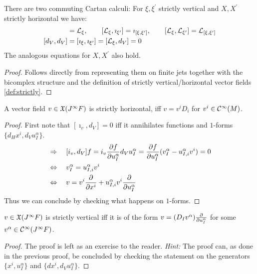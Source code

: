 \begin{prop}
  There are two commuting Cartan calculi: For $\xi, \xi^\prime$ strictly vertical and $X,X^\prime$ strictly horizontal we have:
  \begin{align*}
    [\imath_\xi, d_V] &= \lie{\xi}, \quad \quad [\lie{\xi}, \imath_{\xi^\prime}] = \imath_{[\xi, \xi^\prime]}, \quad \quad [\lie{\xi}, \lie{\xi^\prime}] = \lie{[\xi, \xi^\prime]}\\
    [d_V,d_V] &= [\imath_\xi, \imath_{\xi^\prime}] = [\lie{\xi}, d_V] = 0
  \end{align*}
  The analogous equations for $X, X^\prime$ also hold.
\begin{proof}
  Follows directly from representing them on finite jets together with the bicomplex structure and the definition of strictly vertical/horizontal vector fields \ref{def:strictly}.
\end{proof}
\end{prop}

\begin{lem}
  A vector field $v\in \mathfrak{X}(J^\infty F)$ is strictly horizontal, iff $v = v^i D_i$ for $v^i \in \mathcal{C}^{\infty}(M)$.
\begin{proof}
  First note that $[\imath_v, d_V] = 0$ iff it annihilates functions and $1$-forms $\{d_H x^i, d_V u^\alpha_I \}$.
  \begin{align*}
    &\Rightarrow \quad [i_v, d_V] f = i_v \frac{\partial f}{\partial u^\alpha_I} d_V u^\alpha_I = \frac{\partial f}{\partial u^\alpha_I} (v^\alpha_I - u^\alpha_{I,i} v^i) = 0\\
    &\Leftrightarrow \quad v^\alpha_I = u^\alpha_{I,i} v^i\\
    &\Leftrightarrow \quad v = v^i \frac{\partial }{\partial x^i} + u^\alpha_{I,i} v^i \frac{\partial }{\partial u^\alpha_I}
  \end{align*}
  Thus we can conclude by checking what happens on $1$-forms.
\end{proof}
\end{lem}

\begin{lem}
  $v\in \mathfrak{X}(J^\infty F)$ is strictly vertical iff it is of the form $v = (D_I v^\alpha) \frac{\partial }{\partial u^\alpha_I}$ for some $v^\alpha \in \mathcal{C}^{\infty}(J^\infty F)$.
\begin{proof}
  The proof is left as an exercise to the reader. \emph{Hint:} The proof can, as done in the previous proof, be concluded by checking the statement on the generators $\{x^i, u^\alpha_I\}$ and $\{dx^i, d_V u^\alpha_I\}$.
\end{proof}
\end{lem}

